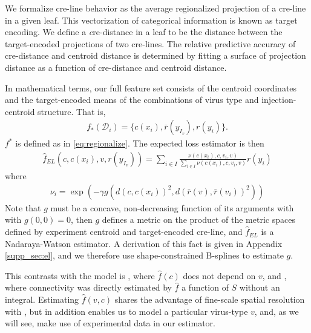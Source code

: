 %
We formalize cre-line behavior as the average regionalized projection of a cre-line in a given leaf.
This vectorization of categorical information is known as target encoding.
We define a {\textit cre-distance} in a leaf to be the distance between the target-encoded projections of two cre-lines.
The relative predictive accuracy of cre-distance and centroid distance is determined by fitting a surface of projection distance as a function of cre-distance and centroid distance. 



In mathematical terms, our full feature set consists of the centroid coordinates and the target-encoded means of the combinations of virus type and injection-centroid structure.
That is, 
\begin{eqnarray*}
f_*({\mathcal D}_i) = \{c(x_i) , \bar r(y_{I_v}), r(y_i) \}.
\end{eqnarray*}
$f^*$ is defined as in \eqref{eq:regionalize}. The expected loss estimator is then 
\begin{eqnarray*}
\hat f_{EL} (c, c(x_i),v , r(y_{I_v})) =  \sum_{i \in I} \frac{ \nu {(c(x_i) , c, v_i, v)}}{\sum_{i \in I} \nu {(c(x_i) , c, v_i, v) }} r(y_i)
\end{eqnarray*}
where
\begin{eqnarray*}
\nu_i = \exp (- \gamma g( d(c, c(x_i))^2, d(\bar r (v), \bar r (v_i))^2))
\end{eqnarray*}
Note that $g$ must be a concave, non-decreasing function of its arguments with with $g(0,0) = 0$, then $g$ defines a metric on the product of the metric spaces defined by experiment centroid and target-encoded cre-line, and $\hat f_{EL}$ is a Nadaraya-Watson estimator.  A derivation of this fact is given in Appendix \ref{supp_sec:el}, and we therefore use shape-constrained B-splines to estimate $g$.

This contrasts with the model is \citet{Knox2019-ot}, where $\hat f(c)$ does not depend on $v$, and \citet{Oh2014-kh}, where connectivity was directly estimated by $\hat f$ a function of $S$ without an integral.
Estimating $\hat f(v, c)$ shares the advantage of fine-scale spatial resolution with \citet{Knox2019-ot}, but in addition enables us to model a particular virus-type $v$, and, as we will see, make use of experimental data in our estimator.



